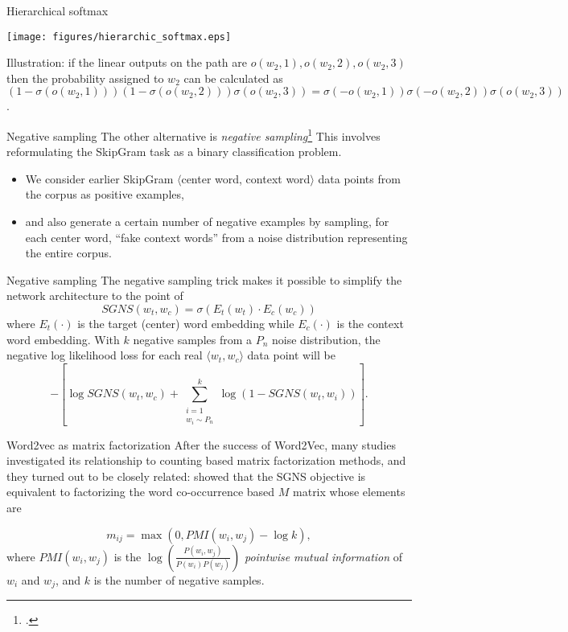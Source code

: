 \documentclass[style=upen, size=14pt]{powerdot}
\newcommand{\gold}{\color{arany}}
\theoremstyle{definition}
\begin{document}
\begin{slide}[toc=]{Hierarchical softmax}
  \begin{center}
    \texttt{[image: figures/hierarchic\_softmax.eps]}
\end{center}
Illustration: if the linear outputs on the path are $o(w_2, 1), o(w_2, 2), o(w_2, 3)$ then the
probability assigned to $w_2$ can be calculated as
$(1-\sigma(o(w_2,1)))(1-\sigma(o(w_2,2)))\sigma(o(w_2,3))=
\sigma(-o(w_2,1))\sigma(-o(w_2,2))\sigma(o(w_2,3))$.
\end{slide}

\begin{slide}[toc=]{Negative sampling}
  The other alternative is \emph{\gold negative
    sampling}\footnote{\citet{mikolov2013distributed}.} This involves
  reformulating the SkipGram task as a binary classification problem.
  \begin{itemize}
  \item We consider earlier SkipGram $\langle$center word, context word$\rangle$
    data points from the corpus as positive examples,
  \item and also generate a certain number of negative examples by sampling, for
    each center word, ``fake context words'' from a noise distribution
    representing the entire corpus.
  \end{itemize}
\end{slide}

\begin{slide}[toc=]{Negative sampling}
  The negative sampling trick makes it possible to simplify the network
  architecture to the point of
  $$
  SGNS(w_{t}, w_{c}) = \sigma(E_t(w_t)\cdot E_c(w_c)) 
  $$
  where $E_t(\cdot)$ is the target (center) word embedding while $E_c(\cdot)$ is
  the context word embedding. With $k$ negative samples from a $P_n$ noise
  distribution, the negative log likelihood loss for each real
  $\langle w_t, w_c\rangle$ data point will be
  $$
  - [ \log SGNS(w_{t}, w_{c}) + \sum_{\substack{i=1 \\ w_i \sim P_n}}^k
  \log(1 - SGNS(w_{t}, {w_i}))].  $$
\end{slide}

\begin{slide}[toc=W2V as factorization]{Word2vec as matrix factorization}
  After the success of Word2Vec, many studies investigated its relationship to
  counting based matrix factorization methods, and they turned out to be closely
  related: \cite{levy2014neural} showed that the SGNS objective is equivalent to
  factorizing the word co-occurrence based $M$ matrix whose elements are

  $$
  m_{ij} = \max(0, PMI(w_i, w_j )- \log k),
  $$
  where $PMI(w_i,w_j)$ is the
  $\log\left(\frac{P(w_i, w_j)}{P(w_i)P(w_j)}\right)$
  \emph{pointwise mutual information} of $w_i$ and $w_j$, and $k$ is the number
  of negative samples.
\end{slide}
\end{document}
